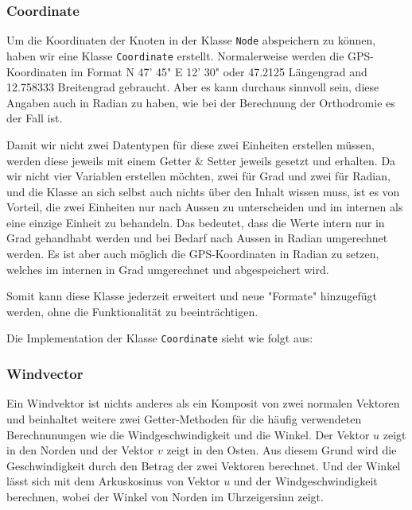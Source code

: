 \subsubsection{Coordinate}
Um die Koordinaten der Knoten in der Klasse \texttt{Node} abspeichern zu können,
haben wir eine Klasse \texttt{Coordinate} erstellt. Normalerweise werden die
GPS-Koordinaten im Format N 47' 45" E 12' 30" oder 47.2125
Längengrad and 12.758333 Breitengrad gebraucht. Aber es kann durchaus sinnvoll
sein, diese Angaben auch in Radian zu haben, wie bei der Berechnung der
Orthodromie es der Fall ist. 

Damit wir nicht zwei Datentypen für diese zwei Einheiten erstellen müssen,
werden diese jeweils mit einem Getter \& Setter jeweils gesetzt und erhalten.
Da wir nicht vier Variablen erstellen möchten, zwei für Grad und zwei für
Radian, und die Klasse an sich selbst auch nichts über den Inhalt wissen muss,
ist es von Vorteil, die zwei Einheiten nur nach Aussen zu unterscheiden und im
internen als eine einzige Einheit zu behandeln. Das bedeutet, dass die Werte
intern nur in Grad gehandhabt werden und bei Bedarf nach Aussen in Radian
umgerechnet werden. Es ist aber auch möglich die GPS-Koordinaten in Radian zu
setzen, welches im internen in Grad umgerechnet und abgespeichert wird. 

Somit kann diese Klasse jederzeit erweitert und neue "Formate" hinzugefügt
werden, ohne die Funktionalität zu beeinträchtigen.

Die Implementation der Klasse \texttt{Coordinate} sieht wie folgt aus:



\subsubsection{Windvector}
Ein Windvektor ist nichts anderes als ein Komposit von zwei normalen Vektoren und
beinhaltet weitere zwei Getter-Methoden für die häufig verwendeten Berechnunungen 
wie die Windgeschwindigkeit und die Winkel. Der Vektor $u$ zeigt in den Norden 
und der Vektor $v$ zeigt in den Osten. Aus diesem Grund wird die Geschwindigkeit 
durch den Betrag der zwei Vektoren berechnet. Und der Winkel lässt sich mit dem 
Arkuskosinus von Vektor $u$ und der Windgeschwindigkeit berechnen, wobei der
Winkel von Norden im Uhrzeigersinn zeigt.




